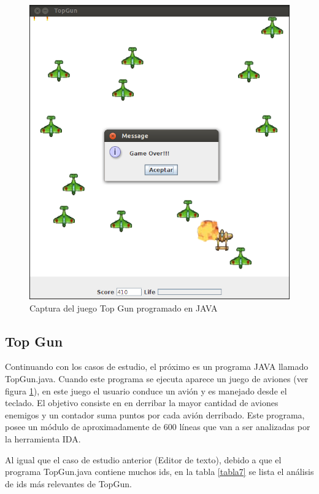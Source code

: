\begin{figure}[b!] %
\centerline{%
\includegraphics[scale= 0.72]{./cap4/caso_03.png}
}
\caption{Captura del juego Top Gun programado en JAVA}
\label{caso3}
\end{figure}

\subsection{Top Gun}
 
Continuando con los casos de estudio, el próximo es un programa JAVA llamado TopGun.java. Cuando este programa se ejecuta aparece un juego de aviones (ver figura \ref{caso3}), en este juego el usuario conduce un avión y es manejado desde el teclado. El objetivo consiste en en derribar la mayor cantidad de aviones enemigos y un contador suma puntos por cada avión derribado.
Este programa, posee un módulo de aproximadamente de 600 líneas que van a ser analizadas por la herramienta IDA.

Al igual que el caso de estudio anterior (Editor de texto), debido a que el programa TopGun.java contiene muchos ids, en la tabla \ref{tabla7} se lista el análisis de ids más relevantes de TopGun.\\

